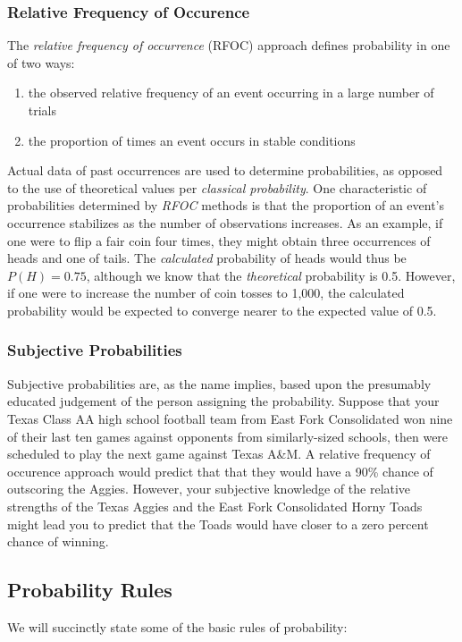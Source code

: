 \documentclass[12pt]{article}
\begin{document}
\subsubsection{Relative Frequency of Occurence}
The \textit{relative frequency of occurrence} (RFOC) approach defines probability in one of two ways:
\begin{enumerate}
\item the observed relative frequency of an event occurring in a large number of trials
\item the proportion of times an event occurs in stable conditions
\end{enumerate}
Actual data of past occurrences are used to determine probabilities, as opposed to the use of theoretical values per \textit{classical probability}. One characteristic of probabilities determined by \textit{RFOC} methods is that the proportion of an event's occurrence stabilizes as the number of observations increases. As an example, if one were to flip a fair coin four times, they might obtain three occurrences of heads and one of tails. The \textit{calculated} probability of heads would thus be $P(H) = 0.75$, although we know that the \textit{theoretical} probability is 0.5. However, if one were to increase the number of coin tosses to 1,000, the calculated probability would be expected to converge nearer to the expected value of 0.5.

\subsubsection{Subjective Probabilities}
Subjective probabilities are, as the name implies, based upon the presumably educated judgement of the person assigning the probability. Suppose that your Texas Class AA high school football team from East Fork Consolidated won nine of their last ten games against opponents from similarly-sized schools, then were scheduled to play the next game against Texas A\&M. A relative frequency of occurence approach would predict that that they would have a 90\% chance of outscoring the Aggies. However, your subjective knowledge of the relative strengths of the Texas Aggies and the East Fork Consolidated Horny Toads might lead you to predict that the Toads would have closer to a zero percent chance of winning.

\subsection{Probability Rules}
We will succinctly state some of the basic rules of probability:
\end{document}
